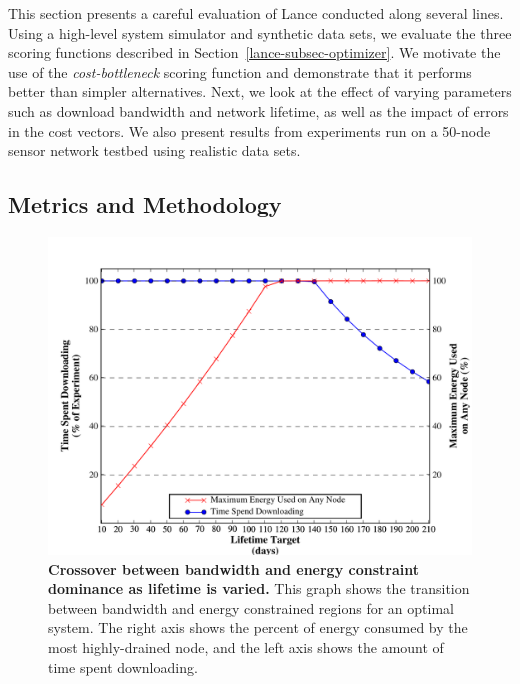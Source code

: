 This section presents a careful evaluation of Lance conducted along several
lines. Using a high-level system simulator and synthetic data sets, we
evaluate the three scoring functions described in
Section~\ref{lance-subsec-optimizer}. We motivate the use of the
\textit{cost-bottleneck} scoring function and demonstrate that it performs
better than simpler alternatives. Next, we look at the effect of varying
parameters such as download bandwidth and network lifetime, as well as the
impact of errors in the cost vectors. We also present results from
experiments run on a 50-node sensor network testbed using realistic data
sets.

\subsection{Metrics and Methodology}

\begin{figure}[t]
\begin{center}
\includegraphics[width=1.0\hsize]{./4-lance/figs/crossover.pdf}
\end{center}

\caption{\textbf{Crossover between bandwidth and energy constraint dominance
as lifetime is varied.} This graph shows the transition between bandwidth and
energy constrained regions for an optimal system. The right axis shows the
percent of energy consumed by the most highly-drained node, and the left axis
shows the amount of time spent downloading.}

\label{lance-fig-crossover}
\end{figure}

